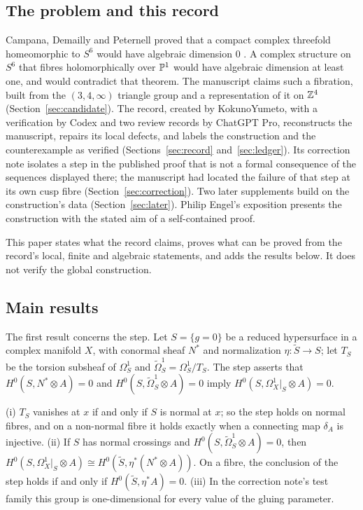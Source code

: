 \subsection*{The problem and this record}

Campana, Demailly and Peternell proved that a compact complex threefold homeomorphic to $S^6$ would have algebraic dimension $0$ \cite[Corollary~2.3]{CDP20}. A complex structure on $S^6$ that fibres holomorphically over $\mathbb{P}^1$ would have algebraic dimension at least one, and would contradict that theorem. The manuscript \cite{AlpogeS6} claims such a fibration, built from the $(3,4,\infty)$ triangle group and a representation of it on $\mathbb{Z}^4$ (Section~\ref{sec:candidate}). The record, created by KokunoYumeto, with a verification by Codex and two review records by ChatGPT Pro, reconstructs the manuscript, repairs its local defects, and labels the construction and the counterexample as verified (Sections~\ref{sec:record} and~\ref{sec:ledger}). Its correction note isolates a step in the published proof that is not a formal consequence of the sequences displayed there; the manuscript had located the failure of that step at its own cusp fibre (Section~\ref{sec:correction}). Two later supplements build on the construction's data (Section~\ref{sec:later}). Philip Engel's exposition \cite{EngelS6} presents the construction with the stated aim of a self-contained proof.

This paper states what the record claims, proves what can be proved from the record's local, finite and algebraic statements, and adds the results below. It does not verify the global construction.

\subsection*{Main results}

The first result concerns the step. Let $S=\{g=0\}$ be a reduced hypersurface in a complex manifold $X$, with conormal sheaf $N^*$ and normalization $\eta:\tilde S\to S$; let $T_S$ be the torsion subsheaf of $\Omega^1_S$ and $\widetilde\Omega^1_S=\Omega^1_S/T_S$. The step asserts that $H^0(S,N^*\otimes A)=0$ and $H^0(S,\widetilde\Omega^1_S\otimes A)=0$ imply $H^0(S,\Omega^1_X|_S\otimes A)=0$.

\begin{introthm}
\textup{(i)} $T_S$ vanishes at $x$ if and only if $S$ is normal at $x$; so the step holds on normal fibres, and on a non-normal fibre it holds exactly when a connecting map $\delta_A$ is injective.
\textup{(ii)} If $S$ has normal crossings and $H^0(S,\widetilde\Omega^1_S\otimes A)=0$, then $H^0(S,\Omega^1_X|_S\otimes A)\cong H^0(\tilde S,\eta^*(N^*\otimes A))$. On a fibre, the conclusion of the step holds if and only if $H^0(\tilde S,\eta^*A)=0$.
\textup{(iii)} In the correction note's test family this group is one-dimensional for every value of the gluing parameter.
\end{introthm}

